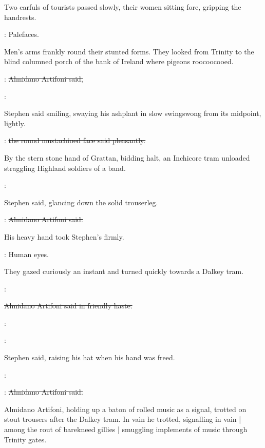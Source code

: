 Two carfuls of tourists passed slowly,
their women sitting fore,
gripping the handrests.

\StephenInt:
Palefaces.

Men's arms frankly round their stunted forms.
They looked from Trinity
to the blind columned porch of the bank of Ireland
where pigeons roocoocooed.

\artifoni:
\sout{Almidano Artifoni said,}

\Stephen:

Stephen said smiling,
swaying his ashplant in slow swingswong from its midpoint,
lightly.

\artifoni:
\sout{the round mustachioed face said pleasantly.}

By the stern stone hand of Grattan,
bidding halt,
an Inchicore tram unloaded straggling Highland soldiers of a band.

\Stephen:

Stephen said,
glancing down the solid trouserleg.

\artifoni:
\sout{Almidano Artifoni said.}

His heavy hand took Stephen's firmly.

\StephenInt:
Human eyes.

They gazed curiously an instant and turned quickly towards a Dalkey tram.

\artifoni:

\sout{Almidano Artifoni said in friendly haste.}

\artifoni:

\Stephen:

Stephen said,
raising his hat when his hand was freed.

\Stephen:

\artifoni:
\sout{Almidano Artifoni said.}

Almidano Artifoni,
holding up a baton of rolled music as a signal,
trotted on stout trousers after the Dalkey tram.
In vain he trotted,
signalling in vain |
among the rout of barekneed gillies |
smuggling implements of music through Trinity gates.


